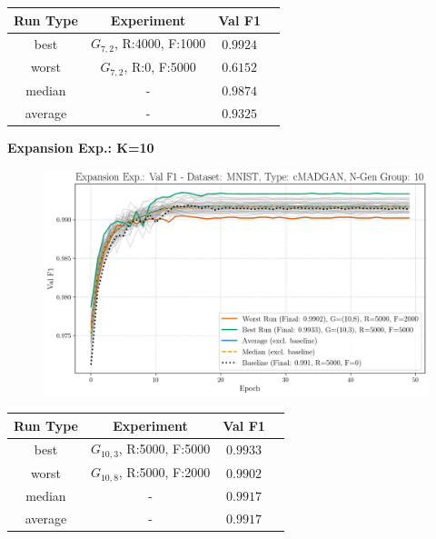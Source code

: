 \begin{table}[H]
	\vspace{-1em}
	\centering
	\begin{tabular}{|c|c|c|c|}
		\hline
		Run Type & Experiment & Val F1 \\ \hline
		best & \(G_{7, 2}\), R:4000, F:1000 & $0.9924$\\ \hline
		worst & \(G_{7, 2}\), R:0, F:5000 & $0.6152$\\ \hline
		median & - & $0.9874$\\ \hline
		average & - & $0.9325$
		\\ \hline
	\end{tabular}
\end{table}
\newpage
\noindent\textbf{Expansion Exp.: K=10}
\begin{figure}[htbp]
	\centering
	\includegraphics[width=.85\textwidth]{abb/strat_classifier_performance/MNIST_STRATIFIED_CLASSIFIERS_cMADGAN_NEW/expansion_experiments/val_f1_score_cMADGAN_MNIST_n_gen_10_all.png}
	\label{fig:app_strat_class_performance_expansion_exp._val_f1_score_10}
\end{figure}
\begin{table}[H]
	\vspace{-1em}
	\centering
	\begin{tabular}{|c|c|c|c|}
		\hline
		Run Type & Experiment & Val F1 \\ \hline
		best & \(G_{10, 3}\), R:5000, F:5000 & $0.9933$\\ \hline
		worst & \(G_{10, 8}\), R:5000, F:2000 & $0.9902$\\ \hline
		median & - & $0.9917$\\ \hline
		average & - & $0.9917$
		\\ \hline
	\end{tabular}
\end{table}
